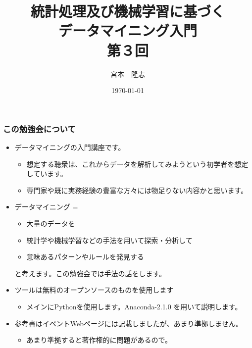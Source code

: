 \documentclass{beamer}
\title{統計処理及び機械学習に基づく\\データマイニング入門\\第３回}
\author{宮本　隆志}
\institute{ナビプラス株式会社}
\date{\today}
\begin{document}
\begin{frame}
  \titlepage
\end{frame}
\begin{frame}
  \frametitle{この勉強会について}
  \begin{itemize}
    \item データマイニングの入門講座です。
    \begin{itemize}
      \item 想定する聴衆は、これからデータを解析してみようという初学者を想定しています。
      \item 専門家や既に実務経験の豊富な方々には物足りない内容かと思います。
    \end{itemize}
    \item データマイニング = 
    \begin{itemize}
      \item 大量のデータを
      \item 統計学や機械学習などの手法を用いて探索・分析して
      \item 意味あるパターンやルールを発見する
    \end{itemize}
    と考えます。この勉強会では手法の話をします。
    \item ツールは無料のオープンソースのものを使用します
    \begin{itemize}
      \item メインにPythonを使用します。Anaconda-2.1.0 を用いて説明します。
    \end{itemize}
    \item 参考書はイベントWebページには記載しましたが、あまり準拠しません。
    \begin{itemize}
      \item あまり準拠すると著作権的に問題があるので。
    \end{itemize}
  \end{itemize}
\end{frame}
\end{document}
